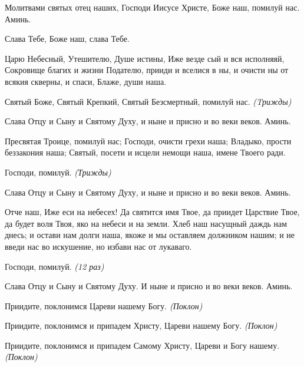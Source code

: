 Молитвами святых отец наших, Господи Иисусе Христе, Боже наш, помилуй
нас. Аминь.



   Слава Тебе, Боже наш, слава Тебе.



   Царю Небесный, Утешителю, Душе истины, Иже везде сый и вся
исполняяй, Сокровище благих и жизни Подателю, прииди и вселися в ны, и
очисти ны от всякия скверны, и спаси, Блаже, души наша.



   Святый Боже, Святый Крепкий, Святый Безсмертный, помилуй нас. \itshape 
(Tрижды)\normalfont{}



   Слава Отцу и Сыну и Святому Духу, и ныне и присно и во веки веков.
Аминь.



   Пресвятая Троице, помилуй нас; Господи, очисти грехи наша; Владыко,
прости беззакония наша; Святый, посети и исцели немощи наша, имене
Твоего ради.



   Господи, помилуй. \itshape  (Трижды)\normalfont{}



   Слава Отцу и Сыну и Святому Духу, и ныне и присно и во веки веков.
Аминь.



   Отче наш, Иже еси на небесех! Да святится имя Твое, да приидет
Царствие Твое, да будет воля Твоя, яко на небеси и на земли. Хлеб наш
насущный даждь нам днесь; и остави нам долги наша, якоже и мы оставляем
должником нашим; и не введи нас во искушение, но избави нас от
лукаваго.



   Господи, помилуй. \itshape (12 раз)\normalfont{}



   Слава Отцу и Сыну и Святому Духу. И ныне и присно и во веки веков.
Аминь.



   Приидите, поклонимся Цареви нашему Богу. \itshape (Поклон)\normalfont{}



   Приидите, поклонимся и припадем Христу, Цареви нашему Богу.
\itshape (Поклон)\normalfont{}



   Приидите, поклонимся и припадем Самому Христу, Цареви и Богу
нашему. \itshape (Поклон)\normalfont{}



